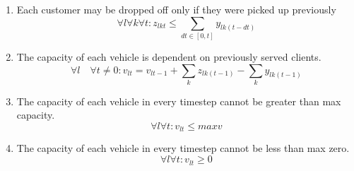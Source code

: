 \documentclass{article}
\begin{document}
\begin{enumerate}
    \item Each customer may be dropped off only if they were picked up previously
    \begin{equation}
        \forall l \forall k \forall t: z_{lkt} \leq \sum_{dt \in [0, t]} y_{lk(t - dt)}
    \end{equation}

    \item The capacity of each vehicle is dependent on previously served clients.
    \begin{equation}
        \forall l \quad \forall t \neq 0: v_{lt} = v_{lt-1} + \sum_k z_{lk(t-1)} - \sum_k y_{lk(t-1)}
    \end{equation}

    \item The capacity of each vehicle in every timestep cannot be greater than max capacity.
    \begin{equation}
        \forall l \forall t: v_{lt} \leq maxv
    \end{equation}

    \item The capacity of each vehicle in every timestep cannot be less than max zero.
    \begin{equation}
        \forall l \forall t: v_{lt} \geq 0
    \end{equation}

\end{enumerate}
\end{document}
